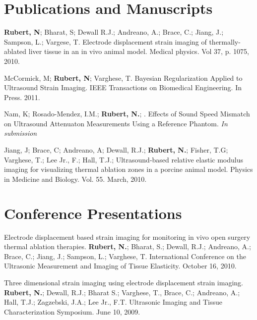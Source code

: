 \documentclass[margin,line]{res}
\begin{document}
\begin{resume}
\section{\sc Publications and Manuscripts}

{\bf Rubert, N}; Bharat, S; Dewall R.J.; Andreano, A.; Brace, C.; Jiang, J.; Sampson, L.; Vargese, T.  Electrode displacement strain imaging of thermally-ablated liver tissue in an in vivo animal model.  Medical physics. Vol 37, p. 1075, 2010.

McCormick, M; {\bf Rubert, N}; Varghese, T. Bayesian Regularization Applied to
Ultrasound Strain Imaging. IEEE Transactions on Biomedical Engineering.
In Press. 2011.

Nam, K; Rosado-Mendez, I.M.; {\bf Rubert, N.}; .  Effects of Sound Speed Mismatch on Ultrasound Attenuaton Measurements Using a Reference Phantom.  	{\it In submission}

Jiang, J; Brace, C; Andreano, A; Dewall, R.J.; {\bf Rubert, N.}; Fisher, T.G; Varghese, T.; Lee Jr., F.; Hall, T.J.;  Ultrasound-based relative elastic modulus imaging for visualizing thermal ablation zones in a porcine animal model.  Physics in Medicine and Biology.  Vol. 55.  March, 2010.


\section{\sc Conference Presentations}

Electrode displacement based strain imaging for monitoring in vivo open surgery thermal ablation therapies.  {\bf Rubert, N.}; Bharat, S.; Dewall, R.J.; Andreano, A.; Brace, C.; Jiang, J.; Sampson, L.; Varghese, T. International Conference on the Ultrasonic Measurement and Imaging of Tissue Elasticity.  October 16, 2010.

Three dimensional strain imaging using electrode displacement strain imaging.  {\bf Rubert, N.}; Dewall, R.J.; Bharat S.; Varghese, T., Brace, C.; Andreano, A.; Hall, T.J.; Zagzebski, J.A.; Lee Jr., F.T.  Ultrasonic Imaging and Tissue Characterization Symposium.  June 10, 2009.

\end{resume}
\end{document}

